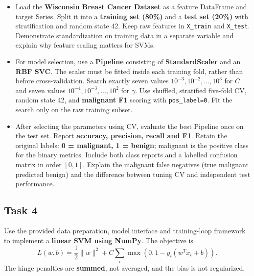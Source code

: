 \documentclass[12pt,a4paper]{article}
\begin{document}
\begin{itemize}
  \item Load the \textbf{Wisconsin Breast Cancer Dataset} as a feature DataFrame
        and target Series. Split it into a \textbf{training set (80\%)} and a
        \textbf{test set (20\%)} with stratification and random state 42.
        Keep raw features in \texttt{X\_train} and \texttt{X\_test}.
        Demonstrate standardization on training data in a separate variable and
        explain why feature scaling matters for SVMs.

  \item For model selection, use a \textbf{Pipeline} consisting of
        \textbf{StandardScaler} and an \textbf{RBF SVC}. The scaler must be fitted
        inside each training fold, rather than before cross-validation.
        Search exactly seven values $10^{-3},10^{-2},\ldots,10^3$ for $C$ and
        seven values $10^{-4},10^{-3},\ldots,10^2$ for $\gamma$.
        Use shuffled, stratified five-fold CV, random state 42, and
        \textbf{malignant F1} scoring with \texttt{pos\_label=0}.
        Fit the search only on the raw training subset.

  \item After selecting the parameters using CV, evaluate the best Pipeline once
        on the test set. Report \textbf{accuracy, precision, recall and F1}.
        Retain the original labels: \textbf{0 = malignant, 1 = benign}; malignant
        is the positive class for the binary metrics. Include both class reports
        and a labelled confusion matrix in order $[0,1]$. Explain the malignant
        false negatives (true malignant predicted benign) and the difference
        between tuning CV and independent test performance.
\end{itemize}

\subsection{Task 4}

Use the provided data preparation, model interface and training-loop framework
to implement a \textbf{linear SVM using NumPy}. The objective is
\[
  L(w,b)=\frac12\lVert w\rVert^2+
  C\sum_i\max\!\left(0,1-y_i(w^T x_i+b)\right).
\]
The hinge penalties are \textbf{summed}, not averaged, and the bias is not
regularized.
\end{document}
